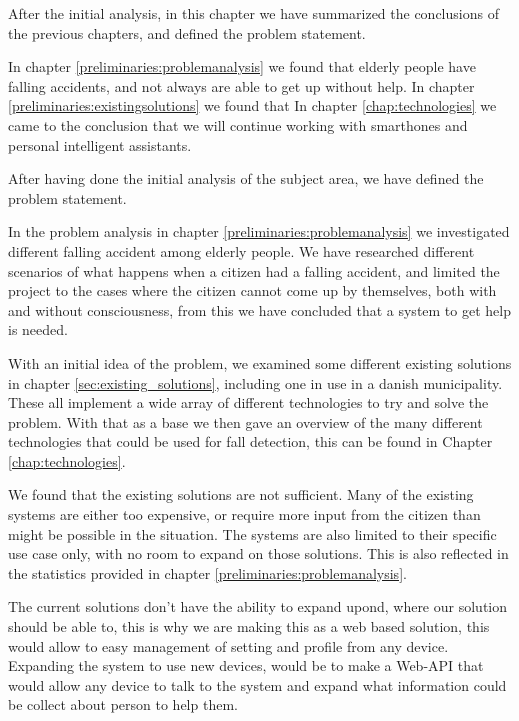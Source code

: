 \label{problemdefinition}

After the initial analysis, in this chapter we have summarized the conclusions of the previous chapters, and defined the problem statement.

In chapter \ref{preliminaries:problemanalysis} we found that elderly people have falling accidents, and not always are able to get up without help.
In chapter \ref{preliminaries:existingsolutions} we found that 
In chapter \ref{chap:technologies} we came to the conclusion that we will continue working with smarthones and personal intelligent assistants. 

\iffalse

After having done the initial analysis of the subject area, we have defined the problem statement.

In the problem analysis in chapter \ref{preliminaries:problemanalysis} we investigated different falling accident among elderly people. We have researched different scenarios of what happens when a citizen had a falling accident, and limited the project to the cases where the citizen cannot come up by themselves, both with and without consciousness, from this we have concluded that a system to get help is needed.

With an initial idea of the problem, we examined some different existing solutions in chapter \ref{sec:existing_solutions}, including one in use in a danish municipality. These all implement a wide array of different technologies to try and solve the problem. With that as a base we then gave an overview of the many different technologies that could be used for fall detection, this can be found in Chapter \ref{chap:technologies}.

We found that the existing solutions are not sufficient. Many of the existing systems are either too expensive, or require more input from the citizen than might be possible in the situation. The systems are also limited to their specific use case only, with no room to expand on those solutions. This is also reflected in the statistics provided in chapter \ref{preliminaries:problemanalysis}.

The current solutions don't have the ability to expand upond, where our solution should be able to, this is why we are making this as a web based solution, this would allow to easy management of setting and profile from any device. Expanding the system to use new devices, would be to make a Web-API that would allow any device to talk to the system and expand what information could be collect about person to help them.

